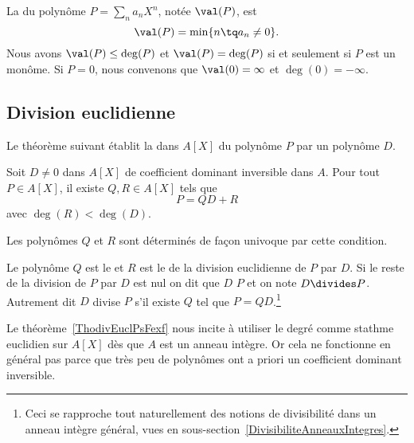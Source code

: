 La  du polynôme \( P=\sum_n a_nX^n\), notée \( \val(P)\), est
\begin{equation}
    \val(P)=\min\{ n\tq a_n\neq 0 \}.
\end{equation}
Nous avons \( \val(P)\leq \deg(P)\) et \( \val(P)=\deg(P)\) si et seulement si \( P\) est un monôme. Si \( P=0\), nous convenons que \( \val(0)=\infty\) et \( \deg(0)=-\infty\).

\subsection{Division euclidienne}

Le théorème suivant établit la  dans \( A[X]\) du polynôme \( P\) par un polynôme \( D\).
\begin{theorem}     \label{ThodivEuclPsFexf}
    Soit \( D\neq 0\) dans \( A[X]\) de coefficient dominant inversible dans \( A\). Pour tout \( P\in A[X]\), il existe \( Q,R\in A[X]\) tels que
    \begin{equation}
        P=QD+R
    \end{equation}
    avec \( \deg(R)<\deg(D)\).

    Les polynômes \( Q\) et \( R\) sont déterminés de façon univoque par cette condition.
\end{theorem}

\begin{definition}\label{DefMPZooMmMymG}
    Le polynôme \( Q\) est le  et \( R\) est le  de la division euclidienne de \( P\) par \( D\). Si le reste de la division de \( P\) par $D$ est nul on dit que \( D\)  \( P\) et on note \( D\divides P\). Autrement dit \( D\) divise \( P\) s'il existe \( Q\) tel que \( P=QD\).\footnote{Ceci se rapproche tout naturellement des notions de divisibilité dans un anneau intègre général, vues en sous-section~\ref{DivisibiliteAnneauxIntegres}.}
\end{definition}

\begin{normaltext}
    Le théorème~\ref{ThodivEuclPsFexf} nous incite à utiliser le degré comme stathme euclidien sur \( A[X]\) dès que \( A\) est un anneau intègre. Or cela ne fonctionne en général pas parce que très peu de polynômes ont a priori un coefficient dominant inversible.
\end{normaltext}

